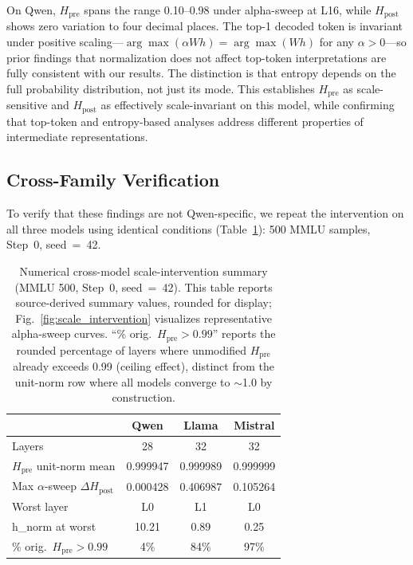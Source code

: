 \documentclass{ieeeaccess}
\newcommand{\Hpre}{H_{\text{pre}}}
\newcommand{\Hpost}{H_{\text{post}}}
\begin{document}
On Qwen, $\Hpre$ spans the range 0.10--0.98 under alpha-sweep at L16, while $\Hpost$ shows zero variation to four decimal places. The top-1 decoded token is invariant under positive scaling---$\arg\max(\alpha Wh) = \arg\max(Wh)$ for any $\alpha > 0$---so prior findings that normalization does not affect top-token interpretations \cite{geva2022transformer} are fully consistent with our results. The distinction is that entropy depends on the full probability distribution, not just its mode. This establishes $\Hpre$ as scale-sensitive and $\Hpost$ as effectively scale-invariant on this model, while confirming that top-token and entropy-based analyses address different properties of intermediate representations.

\subsection{Cross-Family Verification}

To verify that these findings are not Qwen-specific, we repeat the intervention on all three models using identical conditions (Table~\ref{tab:crossmodel}): 500 MMLU samples, Step~0, seed~=~42.

\begin{table}[!ht]
\centering
\caption{Numerical cross-model scale-intervention summary (MMLU 500, Step~0, seed~=~42). This table reports source-derived summary values, rounded for display; Fig.~\ref{fig:scale_intervention} visualizes representative alpha-sweep curves. ``\% orig.\ $\Hpre{>}0.99$'' reports the rounded percentage of layers where unmodified $\Hpre$ already exceeds 0.99 (ceiling effect), distinct from the unit-norm row where all models converge to ${\sim}$1.0 by construction.}
\label{tab:crossmodel}
\footnotesize
\setlength{\tabcolsep}{3pt}
\begin{tabular}{l ccc}
\toprule
 & \textbf{Qwen} & \textbf{Llama} & \textbf{Mistral} \\
\midrule
Layers & 28 & 32 & 32 \\
$\Hpre$ unit-norm mean & 0.999947 & 0.999989 & 0.999999 \\
Max $\alpha$-sweep $\Delta\Hpost$ & 0.000428 & 0.406987 & 0.105264 \\
Worst layer & L0 & L1 & L0 \\
h\_norm at worst & 10.21 & 0.89 & 0.25 \\
\% orig.\ $\Hpre{>}0.99$ & 4\% & 84\% & 97\% \\
\bottomrule
\end{tabular}
\end{table}
\end{document}
